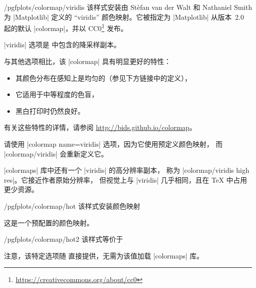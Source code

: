 \begin{stylekey}{/pgfplots/colormap/viridis}
    该样式安装由 Stèfan van der Walt 和 Nathaniel Smith 为
    |Matplotlib| 定义的 ``viridis'' 颜色映射。它被指定为
    |Matplotlib| 从版本~2.0 起的默认 |colormap|，并以
    CC0\footnote{\url{https://creativecommons.org/about/cc0}} 发布。

    |viridis| 选项是 \PGFPlots{} 中包含的降采样副本。

\begin{codeexample}
\pgfplotsset{
    colormap name=viridis,
}
\end{codeexample}

    与其他选项相比，该 |colormap| 具有明显更好的特性：
    \begin{itemize}
        \item 其颜色分布在感知上是均匀的（参见下方链接中的定义），
        \item 它适用于中等程度的色盲，
        \item 黑白打印时仍然良好。
    \end{itemize}
    有关这些特性的详情，请参阅
    \url{http://bids.github.io/colormap}。

    请使用 |colormap name=viridis| 选项，因为它使用预定义颜色映射，
    而 |colormap/viridis| 会重新定义它。

    |colormaps| 库中还有一个 |viridis| 的高分辨率副本，
    称为 |colormap/viridis high res|。它接近作者原始分辨率，
    但视觉上与 |viridis| 几乎相同，且在 \TeX{} 中占用更少资源。
\end{stylekey}

\begin{stylekey}{/pgfplots/colormap/hot}
    该样式安装颜色映射
\begin{codeexample}
\end{codeexample}


    这是一个预配置的颜色映射。
\end{stylekey}

\begin{stylekey}{/pgfplots/colormap/hot2}
    该样式等价于
\begin{codeexample}
\end{codeexample}


    注意，该特定选项随 \PGFPlots{} 直接提供，无需为该值加载 |colormaps| 库。

    \matlabcolormaptext
\end{stylekey}

